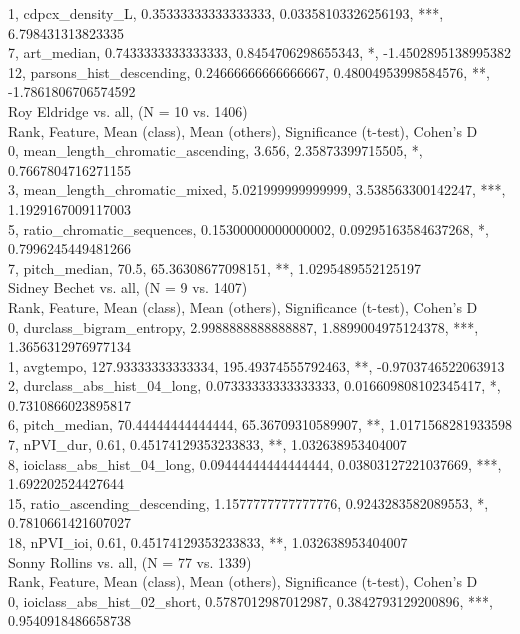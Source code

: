 1, cdpcx_density_L, 0.35333333333333333, 0.03358103326256193, ***, 6.798431313823335\\
7, art_median, 0.7433333333333333, 0.8454706298655343, *, -1.4502895138995382\\
12, parsons_hist_descending, 0.24666666666666667, 0.48004953998584576, **, -1.7861806706574592\\
Roy Eldridge vs. all, (N = 10 vs. 1406)\\
Rank, Feature, Mean (class), Mean (others), Significance (t-test), Cohen's D\\
0, mean_length_chromatic_ascending, 3.656, 2.35873399715505, *, 0.7667804716271155\\
3, mean_length_chromatic_mixed, 5.021999999999999, 3.538563300142247, ***, 1.1929167009117003\\
5, ratio_chromatic_sequences, 0.15300000000000002, 0.09295163584637268, *, 0.7996245449481266\\
7, pitch_median, 70.5, 65.36308677098151, **, 1.0295489552125197\\
Sidney Bechet vs. all, (N = 9 vs. 1407)\\
Rank, Feature, Mean (class), Mean (others), Significance (t-test), Cohen's D\\
0, durclass_bigram_entropy, 2.9988888888888887, 1.8899004975124378, ***, 1.3656312976977134\\
1, avgtempo, 127.93333333333334, 195.49374555792463, **, -0.9703746522063913\\
2, durclass_abs_hist_04_long, 0.07333333333333333, 0.016609808102345417, *, 0.7310866023895817\\
6, pitch_median, 70.44444444444444, 65.36709310589907, **, 1.0171568281933598\\
7, nPVI_dur, 0.61, 0.45174129353233833, **, 1.032638953404007\\
8, ioiclass_abs_hist_04_long, 0.09444444444444444, 0.03803127221037669, ***, 1.692202524427644\\
15, ratio_ascending_descending, 1.1577777777777776, 0.9243283582089553, *, 0.7810661421607027\\
18, nPVI_ioi, 0.61, 0.45174129353233833, **, 1.032638953404007\\
Sonny Rollins vs. all, (N = 77 vs. 1339)\\
Rank, Feature, Mean (class), Mean (others), Significance (t-test), Cohen's D\\
0, ioiclass_abs_hist_02_short, 0.5787012987012987, 0.3842793129200896, ***, 0.9540918486658738\\
